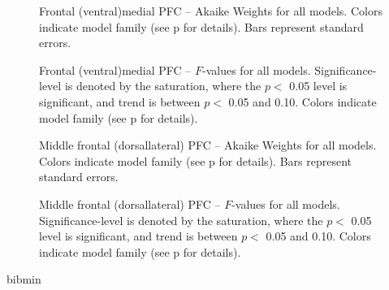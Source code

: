 \documentclass[doc,12pt]{apa}        %
\begin{document}
\begin{figure}[tp]
    \centering
    \caption{Frontal (ventral)medial PFC -- Akaike Weights for all models.  Colors indicate model family (see p\pageref{sub:cmb} for details). Bars represent standard errors.}
	\label{fig:vmpfc}
\end{figure}
\begin{figure}[tp]
    \centering
    \caption{Frontal (ventral)medial PFC -- $F$-values for all models.
    Significance-level is denoted by the saturation, where the $p <$ 0.05 level is
    significant, and trend is between $p <$ 0.05 and 0.10.  Colors indicate model family (see p\pageref{sub:cmb} for details).}
	\label{fig:fvalvmpfc}
\end{figure}

\begin{figure}[tp]
    \centering
    \caption{Middle frontal (dorsallateral) PFC -- Akaike Weights for all models.  Colors indicate model family (see p\pageref{sub:cmb} for details). Bars represent standard errors.}
	\label{fig:dlpfc}
\end{figure}
\begin{figure}[tp]
    \centering
    \caption{Middle frontal (dorsallateral) PFC -- $F$-values for all models.
    Significance-level is denoted by the saturation, where the $p <$ 0.05 level is
    significant, and trend is between $p <$ 0.05 and 0.10.  Colors indicate model family (see p\pageref{sub:cmb} for details).}
	\label{fig:fvaldlpfc}
\end{figure}
\clearpage

\newpage
 {bibmin}
\end{document}
